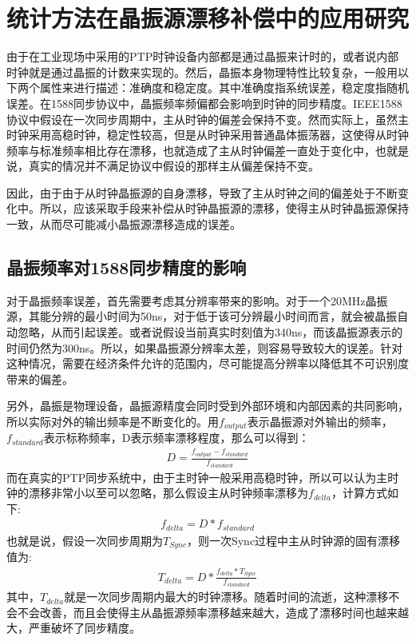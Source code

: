 \section{统计方法在晶振源漂移补偿中的应用研究}
由于在工业现场中采用的PTP时钟设备内部都是通过晶振来计时的，或者说内部时钟就是通过晶振的计数来实现的。然后，晶振本身物理特性比较复杂，一般用以下两个属性来进行描述：准确度和稳定度。其中准确度指系统误差，稳定度指随机误差。在1588同步协议中，晶振频率频偏都会影响到时钟的同步精度。IEEE1588协议中假设在一次同步周期中，主从时钟的偏差会保持不变。然而实际上，虽然主时钟采用高稳时钟，稳定性较高，但是从时钟采用普通晶体振荡器，这使得从时钟频率与标准频率相比存在漂移，也就造成了主从时钟偏差一直处于变化中，也就是说，真实的情况并不满足协议中假设的那样主从偏差保持不变。

因此，由于由于从时钟晶振源的自身漂移，导致了主从时钟之间的偏差处于不断变化中。所以，应该采取手段来补偿从时钟晶振源的漂移，使得主从时钟晶振源保持一致，从而尽可能减小晶振源漂移造成的误差。

\subsection{晶振频率对1588同步精度的影响}
对于晶振频率误差，首先需要考虑其分辨率带来的影响。对于一个20MHz晶振源，其能分辨的最小时间为50ns，对于低于该可分辨最小时间而言，就会被晶振自动忽略，从而引起误差。或者说假设当前真实时刻值为340ns，而该晶振源表示的时间仍然为300ns。所以，如果晶振源分辨率太差，则容易导致较大的误差。针对这种情况，需要在经济条件允许的范围内，尽可能提高分辨率以降低其不可识别度带来的偏差。

另外，晶振是物理设备，晶振源精度会同时受到外部环境和内部因素的共同影响，所以实际对外的输出频率是不断变化的。用$f_{output}$表示晶振源对外输出的频率，$f_{standard}$表示标称频率，D表示频率漂移程度，那么可以得到：
\begin {align}
D = \frac{f_{output} - f_{standard}}{f_{standard}}
\end{align}
而在真实的PTP同步系统中，由于主时钟一般采用高稳时钟，所以可以认为主时钟的漂移非常小以至可以忽略，那么假设主从时钟频率漂移为$f_{delta}$，计算方式如下:
\begin {align}
f_{delta} = D * f_{standard}
\end{align}
也就是说，假设一次同步周期为$T_{Sync}$，则一次Sync过程中主从时钟源的固有漂移值为:
\begin {align}
T_{delta} = D * \frac{f_{delta} * T_{Sync}}{f_{standard}}
\end{align}
其中，$T_{delta}$就是一次同步周期内最大的时钟漂移。随着时间的流逝，这种漂移不会不会改善，而且会使得主从晶振源频率漂移越来越大，造成了漂移时间也越来越大，严重破坏了同步精度。

